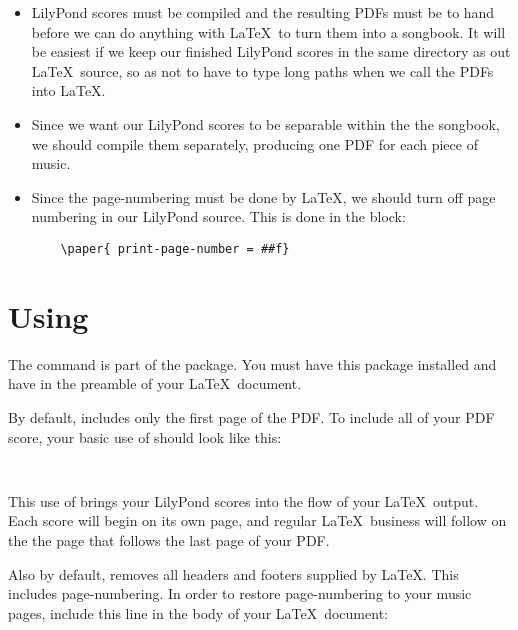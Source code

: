 \documentclass[../../LilyPond-Tutorials]{subfiles}
\begin{document}
\begin{itemize}

\item  LilyPond scores must be compiled and the resulting PDFs must be to hand before we can do anything with \LaTeX\ to turn them into a songbook. 
It will be easiest if we keep our finished LilyPond scores in the same directory as out \LaTeX\ source, so as not to have to type long paths when we call the PDFs into \LaTeX.  

\item  Since we want our LilyPond scores to be separable within the the songbook, we should compile them separately, producing one PDF for each piece of music.  

\item  Since the page-numbering must be done by \LaTeX, we should turn off page numbering in our LilyPond source. 
This is done in the  block:

\begin{verbatim}
	\paper{ print-page-number = ##f} 
\end{verbatim}

\end{itemize}

\section*{Using }

The  command is part of the  package. 
You must have this package installed and have  in the preamble of your \LaTeX\ document.

By default,  includes only the first page of the PDF. 
To include all of your PDF score, your basic use of  should look like this:

\begin{verbatim}
	
\end{verbatim}

This use of  brings your LilyPond scores into the flow of your \LaTeX\ output. 
Each score will begin on its own page, and regular \LaTeX\ business will follow on the the page that follows the last page of your PDF.

Also by default,  removes all headers and footers supplied by \LaTeX. 
This includes page-numbering. 
In order to restore page-numbering to your music pages, include this line in the body of your \LaTeX\ document:
\end{document}
